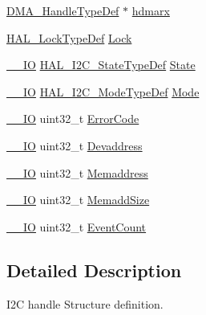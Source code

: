 \begin{DoxyCompactItemize}
\item 
\mbox{\hyperlink{group___d_m_a___exported___types_ga41b754a906b86bce54dc79938970138b}{D\+M\+A\+\_\+\+Handle\+Type\+Def}} $\ast$ \mbox{\hyperlink{struct_i2_c___handle_type_def_abd0aeec20298a55d89a440320e35634f}{hdmarx}}
\item 
\mbox{\hyperlink{stm32f4xx__hal__def_8h_ab367482e943333a1299294eadaad284b}{H\+A\+L\+\_\+\+Lock\+Type\+Def}} \mbox{\hyperlink{struct_i2_c___handle_type_def_ad4cf225029dbefe8d3fe660c33b8bb6b}{Lock}}
\item 
\mbox{\hyperlink{core__sc300_8h_aec43007d9998a0a0e01faede4133d6be}{\+\_\+\+\_\+\+IO}} \mbox{\hyperlink{group___i2_c___exported___types_gaef355af8eab251ae2a19ee164ad81c37}{H\+A\+L\+\_\+\+I2\+C\+\_\+\+State\+Type\+Def}} \mbox{\hyperlink{struct_i2_c___handle_type_def_a48237f31888af06f6c25dead5438f5a7}{State}}
\item 
\mbox{\hyperlink{core__sc300_8h_aec43007d9998a0a0e01faede4133d6be}{\+\_\+\+\_\+\+IO}} \mbox{\hyperlink{group___i2_c___exported___types_gabcbb7b844f2ffd63c4e530c117882062}{H\+A\+L\+\_\+\+I2\+C\+\_\+\+Mode\+Type\+Def}} \mbox{\hyperlink{struct_i2_c___handle_type_def_ac25cb640453370e3b2526799dc24eb5a}{Mode}}
\item 
\mbox{\hyperlink{core__sc300_8h_aec43007d9998a0a0e01faede4133d6be}{\+\_\+\+\_\+\+IO}} uint32\+\_\+t \mbox{\hyperlink{struct_i2_c___handle_type_def_a123c5063e6a3b1901b2fbe5f88c53a7e}{Error\+Code}}
\item 
\mbox{\hyperlink{core__sc300_8h_aec43007d9998a0a0e01faede4133d6be}{\+\_\+\+\_\+\+IO}} uint32\+\_\+t \mbox{\hyperlink{struct_i2_c___handle_type_def_ad6bcf76f2ccfe535724014ef07eae04b}{Devaddress}}
\item 
\mbox{\hyperlink{core__sc300_8h_aec43007d9998a0a0e01faede4133d6be}{\+\_\+\+\_\+\+IO}} uint32\+\_\+t \mbox{\hyperlink{struct_i2_c___handle_type_def_a009bdd1b89c6ca994760617de151645d}{Memaddress}}
\item 
\mbox{\hyperlink{core__sc300_8h_aec43007d9998a0a0e01faede4133d6be}{\+\_\+\+\_\+\+IO}} uint32\+\_\+t \mbox{\hyperlink{struct_i2_c___handle_type_def_a4c670e27912a66ef89546d7006d1b06b}{Memadd\+Size}}
\item 
\mbox{\hyperlink{core__sc300_8h_aec43007d9998a0a0e01faede4133d6be}{\+\_\+\+\_\+\+IO}} uint32\+\_\+t \mbox{\hyperlink{struct_i2_c___handle_type_def_a5b9ab6922825ed4ab1bfeef04f18b90a}{Event\+Count}}
\end{DoxyCompactItemize}


\subsection{Detailed Description}
I2C handle Structure definition. 

